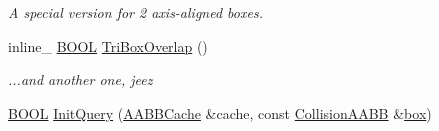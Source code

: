 \begin{DoxyCompactItemize}
\begin{DoxyCompactList}\small\item\em A special version for 2 axis-\/aligned boxes. \end{DoxyCompactList}\item 
\hypertarget{class_a_a_b_b_collider_a313fc46a23409d0abc7d326073433203}{inline\+\_\+ \hyperlink{_ice_types_8h_a050c65e107f0c828f856a231f4b4e788}{B\+O\+O\+L} \hyperlink{class_a_a_b_b_collider_a313fc46a23409d0abc7d326073433203}{Tri\+Box\+Overlap} ()}\label{class_a_a_b_b_collider_a313fc46a23409d0abc7d326073433203}

\begin{DoxyCompactList}\small\item\em ...and another one, jeez \end{DoxyCompactList}\item 
\hyperlink{_ice_types_8h_a050c65e107f0c828f856a231f4b4e788}{B\+O\+O\+L} \hyperlink{class_a_a_b_b_collider_a7c52c2e46be8453af76366074c82fef4}{Init\+Query} (\hyperlink{struct_a_a_b_b_cache}{A\+A\+B\+B\+Cache} \&cache, const \hyperlink{class_collision_a_a_b_b}{Collision\+A\+A\+B\+B} \&\hyperlink{structbox}{box})
\end{DoxyCompactItemize}
